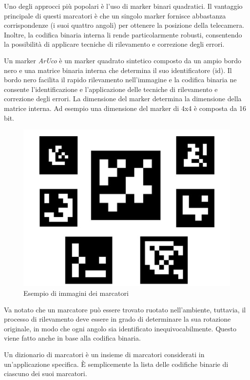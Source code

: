 \documentclass[a4paper]{article}
\begin{document}
Uno degli approcci più popolari è l'uso di marker binari quadratici. Il vantaggio principale di questi marcatori è che un singolo marker fornisce abbastanza corrispondenze (i suoi quattro angoli) per ottenere la posizione della telecamera. Inoltre, la codifica binaria interna li rende particolarmente robusti, consentendo la possibilità di applicare tecniche di rilevamento e correzione degli errori.

Un marker \textit{ArUco} è un marker quadrato sintetico composto da un ampio bordo nero e una matrice binaria interna che determina il suo identificatore (id). Il bordo nero facilita il rapido rilevamento nell'immagine e la codifica binaria ne consente l'identificazione e l'applicazione delle tecniche di rilevamento e correzione degli errori. La dimensione del marker determina la dimensione della matrice interna. Ad esempio una dimensione del marker di 4x4 è composta da 16 bit.

\begin{figure}[htbp]
\centering
\includegraphics[scale=0.5]{marker_img.PNG} 
\caption{Esempio di immagini dei marcatori}
\end{figure}

Va notato che un marcatore può essere trovato ruotato nell'ambiente, tuttavia, il processo di rilevamento deve essere in grado di determinare la sua rotazione originale, in modo che ogni angolo sia identificato inequivocabilmente. Questo viene fatto anche in base alla codifica binaria.

Un dizionario di marcatori è un insieme di marcatori considerati in un'applicazione specifica. È semplicemente la lista delle codifiche binarie di ciascuno dei suoi marcatori.
\end{document}
